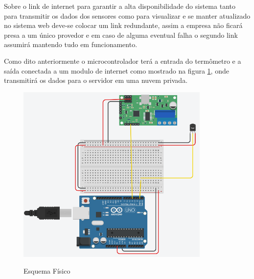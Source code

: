     Sobre o link de internet para garantir a 
    alta disponibilidade do sistema tanto 
    para transmitir os dados dos sensores 
    como para visualizar e se manter atualizado
    no sistema web deve-se colocar um link redundante,
    assim a empresa não ficará presa a um único provedor 
    e em caso de alguma eventual falha o segundo link 
    assumirá mantendo tudo em funcionamento.

    Como dito anteriormente o microcontrolador terá
    a entrada do termômetro e a saída conectada a um modulo de internet
    como mostrado na figura \ref{fig:esquemaFisico}, onde transmitirá 
    os dados para o servidor em uma nuvem privada.

    \begin{figure}[ht]
        \caption{Esquema Físico}
        \centering
        \includegraphics[width=0.85\textwidth]{img/esquema_fisico.png}
        \label{fig:esquemaFisico}
    \end{figure}

